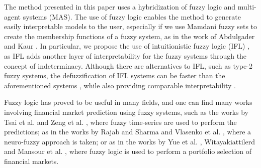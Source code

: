 \documentclass{ieeeaccess}
\begin{document}
The method presented in this paper uses a hybridization of fuzzy logic
and multi-agent systems (MAS). The use of fuzzy logic enables
the method to generate easily interpretable models to the user,
especially if we use Mamdani fuzzy sets \cite{Mamdani1975} 
to create the membership functions of a fuzzy system, as in the
work of Abdulgader and Kaur \cite{Abdulgader2019}. 
In particular, we propose the use of intuitionistic fuzzy logic (IFL)
\cite{Atanassov1986} \cite{Atanassov2003}, as IFL adds another layer
of interpretability for the fuzzy systems through the concept of
indeterminacy. Although there are alternatives to IFL, such as type-2
fuzzy systems, the defuzzification of IFL systems can be faster than
the aforementioned systems \cite{Hernandez-Aguila2017-2}, while also
providing comparable interpretability \cite{Hernandez-Aguila2016} \cite{castillo2019comments} .

Fuzzy logic has proved to be useful in many fields, and one can find
many works involving financial market prediction using fuzzy systems,
such as the works by Tsai et al. \cite{Tsai2019} and Zeng et
al. \cite{Zeng2019}, where fuzzy time-series are used to perform the
predictions; as in the works by Rajab and Sharma \cite{Rajab2019} and
Vlasenko et al. \cite{Vlasenko2019}, where a neuro-fuzzy approach is
taken; or as in the works by Yue et al. \cite{Yue2019},
Witayakiattilerd \cite{Witayakiattilerd2019} and Mansour et
al. \cite{Mansour2019}, where fuzzy logic is used to perform a
portfolio selection of financial markets.
\end{document}
